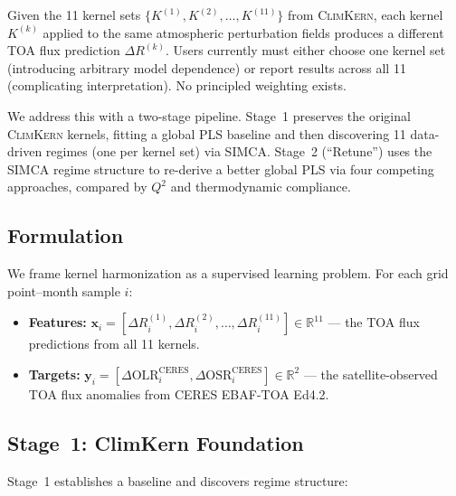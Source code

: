 \documentclass[11pt]{article}
\newcommand{\Qsq}{Q^{2}}
\newcommand{\oldsystem}{\textsc{ClimKern}}
\begin{document}
Given the 11 kernel sets $\{K^{(1)}, K^{(2)}, \ldots,
K^{(11)}\}$ from \oldsystem{}, each kernel $K^{(k)}$ applied to
the same atmospheric perturbation fields produces a different
TOA flux prediction $\Delta R^{(k)}$. Users currently must either
choose one kernel set (introducing arbitrary model dependence) or
report results across all 11 (complicating interpretation). No
principled weighting exists.

We address this with a two-stage pipeline. Stage~1 preserves the
original \oldsystem{} kernels, fitting a global PLS baseline and
then discovering 11 data-driven regimes (one per kernel set) via
SIMCA. Stage~2 (``Retune'') uses the SIMCA regime structure to
re-derive a better global PLS via four competing approaches,
compared by $\Qsq$ and thermodynamic compliance.

\subsection{Formulation}

We frame kernel harmonization as a supervised learning problem.
For each grid point--month sample $i$:

\begin{itemize}[noitemsep]
  \item \textbf{Features:} $\mathbf{x}_i = [\Delta R_i^{(1)},
    \Delta R_i^{(2)}, \ldots, \Delta R_i^{(11)}] \in
    \mathbb{R}^{11}$ --- the TOA flux predictions from all 11
    kernels.
  \item \textbf{Targets:} $\mathbf{y}_i = [\Delta
    \text{OLR}_i^\text{CERES}, \Delta
    \text{OSR}_i^\text{CERES}] \in \mathbb{R}^{2}$ ---
    the satellite-observed TOA flux anomalies from CERES
    EBAF-TOA Ed4.2.
\end{itemize}

\subsection{Stage~1: ClimKern Foundation}
\label{sec:stage1}

Stage~1 establishes a baseline and discovers regime structure:
\end{document}
